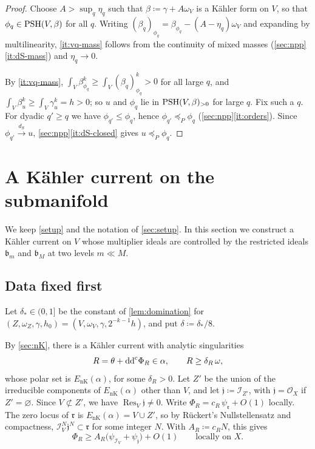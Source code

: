 \documentclass[11pt,a4paper]{amsart}
\newcommand{\EnK}{E_{\mathrm{nK}}}
\newcommand{\dS}{d_{S}}                          %
\newcommand{\rest}[1]{\operatorname{Res}_{#1}}   %
\newcommand{\lessP}{\preceq_{P}}
\theoremstyle{definition}
\begin{document}
\begin{proof}
Choose $A>\sup_q\eta_q$ such that $\beta\coloneqq \gamma+A\omega_V$ is a
K\"ahler form on $V$, so that $\phi_q\in\mathrm{PSH}(V,\beta)$ for all $q$. Writing
$(\beta_q)_{\phi_q}=\beta_{\phi_q}-(A-\eta_q)\omega_V$ and expanding by
multilinearity, \ref{it:vq-mass} follows from the continuity of mixed
masses (\cref{sec:npp}\ref{it:dS-mass}) and $\eta_q\to0$.

By \ref{it:vq-mass}, $\int_V\beta_{\phi_q}^k\ge\int_V(\beta_q)_{\phi_q}^k>0$
for all large $q$, and $\int_V\beta_u^k\ge\int_V\gamma_u^k=h>0$; so $u$ and
$\phi_q$ lie in $\mathrm{PSH}(V,\beta)_{>0}$ for large $q$. Fix such a $q$. For
dyadic $q'\ge q$ we have $\phi_{q'}\le\phi_q$, hence
$\phi_{q'}\lessP\phi_q$ (\cref{sec:npp}\ref{it:orders}). Since
$\phi_{q'}\xrightarrow{\dS}u$, \cref{sec:npp}\ref{it:dS-closed} gives
$u\lessP\phi_q$.
\end{proof}

\section{A K\"ahler current on the submanifold}\label{sec:positive-current}

We keep \cref{setup} and the notation of \cref{sec:setup}. In this section
we construct a K\"ahler current on $V$ whose multiplier ideals are
controlled by the restricted ideals $\mathfrak b_m$ and $\mathfrak b_M$ at
two levels $m\ll M$.

\subsection{Data fixed first}\label{sec:fixed-data}

Let $\delta_*\in(0,1]$ be the constant of \cref{lem:domination} for
$(Z,\omega_Z,\gamma,h_0)=(V,\omega_V,\gamma,2^{-k-1}h)$, and put
$\delta\coloneqq \delta_*/8$.

By \cref{sec:nK}, there is a K\"ahler current with analytic singularities
\[
  R=\theta+\mathrm{dd}^{\mathrm{c}}\Phi_R\in\alpha,\qquad R\ge\delta_R\,\omega,
\]
whose polar set is $\EnK(\alpha)$, for some $\delta_R>0$. Let $Z'$ be
the union of the irreducible components of $\EnK(\alpha)$ other than $V$,
and let $\mathfrak j\coloneqq \mathcal I_{Z'}$, with $\mathfrak j=\mathcal
O_X$ if $Z'=\varnothing$. Since $V\not\subset Z'$, we have
$\rest V\mathfrak j\ne0$. Write $\Phi_R=c_R\,\psi_{\mathfrak r}+O(1)$ locally.
The zero locus of $\mathfrak r$ is $\EnK(\alpha)=V\cup Z'$, so by
R\"uckert's Nullstellensatz \cite[Chapter~II, Theorem~4.22]{DemCADG} and
compactness, $\mathcal I_V^N\mathfrak j^N\subset\mathfrak r$ for some
integer $N$. With $A_R\coloneqq c_RN$, this gives
\begin{equation}\label{eq:PhiR-lower}
  \Phi_R\ge A_R\bigl(\psi_{\mathcal I_V}+\psi_{\mathfrak j}\bigr)+O(1)
  \qquad\text{locally on }X.
\end{equation}
\end{document}
